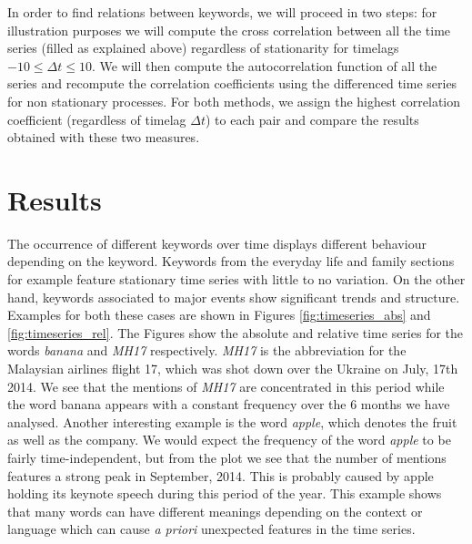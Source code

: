 \documentclass[12pt, a4paper]{article}
\begin{document}
In order to find relations between keywords, we will proceed in two steps: for illustration purposes we will compute the cross correlation between all the time series (filled as explained above) regardless of stationarity for timelags $-10 \leq \Delta t \leq 10$. We will then compute the autocorrelation function of all the series and recompute the correlation coefficients using the differenced time series for non stationary processes. For both methods, we assign the highest correlation coefficient (regardless of timelag $\Delta t$) to each pair and compare the results obtained with these two measures. 

\section{Results}
The occurrence of different keywords over time displays different behaviour depending on the keyword. Keywords from the everyday life and family sections for example feature stationary time series with little to no variation. On the other hand, keywords associated to major events show significant trends and structure. Examples for both these cases are shown in Figures \ref{fig:timeseries_abs} and \ref{fig:timeseries_rel}.  The Figures show the absolute and relative time series for the words \textit{banana} and \textit{MH17} respectively. \textit{MH17} is the abbreviation for the Malaysian airlines flight 17, which was shot down over the Ukraine on July, 17th 2014. We see that the mentions of \textit{MH17} are concentrated in this period while the word banana appears with a constant frequency over the 6 months we have analysed. Another interesting example is the word \textit{apple}, which denotes the fruit as well as the company. We would expect the frequency of the word \textit{apple} to be fairly time-independent, but from the plot we see that the number of mentions features a strong peak in September, 2014. This is probably caused by apple holding its keynote speech during this period of the year. This example shows that many words can have different meanings depending on the context or language which can cause \textit{a priori} unexpected features in the time series. 
\end{document}
